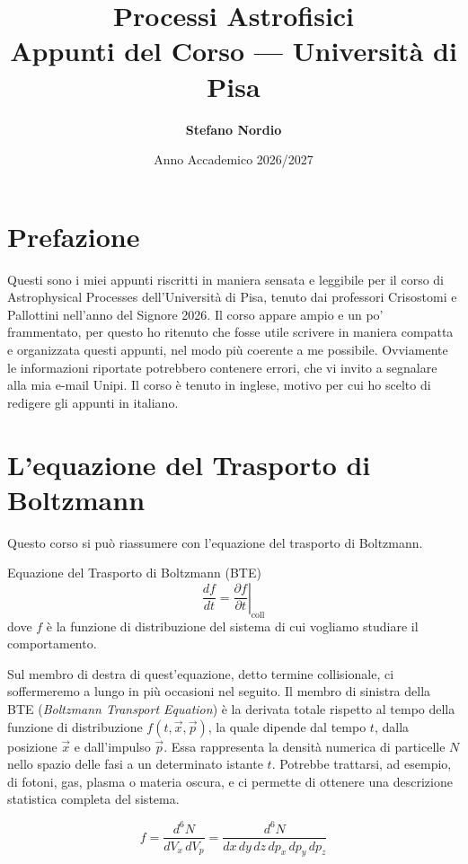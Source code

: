 \documentclass[11pt, a4paper, oneside]{scrreprt}
\title{
    \Huge \textbf{Processi Astrofisici} \\
    \large Appunti del Corso --- Università di Pisa
}
\author{\textbf{Stefano Nordio}}
\date{Anno Accademico 2026/2027}
\begin{document}
\maketitle
\tableofcontents
\newpage

\chapter{Prefazione}
Questi sono i miei appunti riscritti in maniera sensata e leggibile per il corso di Astrophysical Processes
dell'Università di Pisa, tenuto dai professori Crisostomi e Pallottini nell'anno del Signore 2026.
Il corso appare ampio e un po' frammentato, per questo ho ritenuto che fosse utile scrivere
in maniera compatta e organizzata questi appunti, nel modo più coerente a me possibile. Ovviamente le informazioni
riportate potrebbero contenere errori, che vi invito a segnalare alla mia e-mail Unipi.
Il corso è tenuto in inglese, motivo per cui ho scelto di redigere gli appunti in italiano.

\chapter{L'equazione del Trasporto di Boltzmann}
Questo corso si può riassumere con l'equazione del trasporto di Boltzmann.

\begin{formulaBox}{Equazione del Trasporto di Boltzmann (BTE)}
\begin{equation}
    \frac{df}{dt} = \left. \frac{\partial f}{\partial t} \right|_{\text{coll}}
\end{equation}
dove $f$ è la funzione di distribuzione del sistema di cui vogliamo studiare il comportamento.
\end{formulaBox}

Sul membro di destra di quest'equazione, detto termine collisionale, ci soffermeremo a lungo in più occasioni nel seguito.
Il membro di sinistra della BTE (\textit{Boltzmann Transport Equation}) è la derivata totale rispetto al tempo della funzione di
distribuzione $f(t, \vec{x}, \vec{p})$, la quale dipende dal tempo $t$, dalla posizione $\vec{x}$ e dall'impulso $\vec{p}$.
Essa rappresenta la densità numerica di particelle $N$ nello spazio delle fasi a un determinato istante $t$.
Potrebbe trattarsi, ad esempio, di fotoni, gas, plasma o materia oscura, e ci permette di ottenere una descrizione statistica completa del sistema.

\begin{equation} \label{eq:densita_spazio_fasi}
    f = \frac{d^6N}{dV_x \, dV_p} = \frac{d^6N}{dx \, dy \, dz \, dp_x \, dp_y \, dp_z}
\end{equation}
\end{document}
